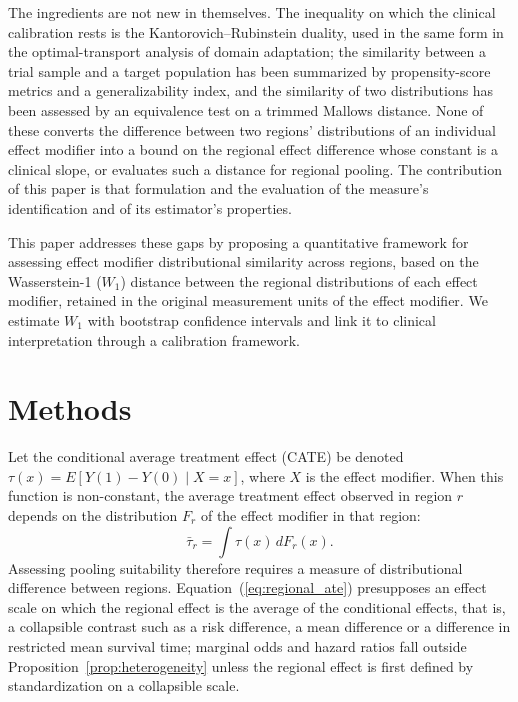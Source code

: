\documentclass[AMA,Times1COL]{WileyNJDv5}
\begin{document}
The ingredients are not new in themselves. The inequality on which the clinical calibration rests is the Kantorovich--Rubinstein duality, used in the same form in the optimal-transport analysis of domain adaptation;\cite{shen2018} the similarity between a trial sample and a target population has been summarized by propensity-score metrics\cite{stuart2011} and a generalizability index,\cite{tipton2014} and the similarity of two distributions has been assessed by an equivalence test on a trimmed Mallows distance.\cite{munk1998} None of these converts the difference between two regions' distributions of an individual effect modifier into a bound on the regional effect difference whose constant is a clinical slope, or evaluates such a distance for regional pooling. The contribution of this paper is that formulation and the evaluation of the measure's identification and of its estimator's properties.



This paper addresses these gaps by proposing a quantitative framework for assessing effect modifier distributional similarity across regions, based on the Wasserstein-1 ($W_1$) distance between the regional distributions of each effect modifier, retained in the original measurement units of the effect modifier. We estimate $W_1$ with bootstrap confidence intervals and link it to clinical interpretation through a calibration framework.


\section{Methods}\label{sec:methods}

Let the conditional average treatment effect (CATE) be denoted $\tau(x) = E[Y(1) - Y(0) \mid X = x]$, where $X$ is the effect modifier. When this function is non-constant, the average treatment effect observed in region $r$ depends on the distribution $F_r$ of the effect modifier in that region:
\begin{equation}
\bar{\tau}_r = \int \tau(x) \, dF_r(x).
\label{eq:regional_ate}
\end{equation}
Assessing pooling suitability therefore requires a measure of distributional difference between regions. Equation~(\ref{eq:regional_ate}) presupposes an effect scale on which the regional effect is the average of the conditional effects, that is, a collapsible contrast such as a risk difference, a mean difference or a difference in restricted mean survival time; marginal odds and hazard ratios fall outside Proposition~\ref{prop:heterogeneity} unless the regional effect is first defined by standardization on a collapsible scale.
\end{document}
